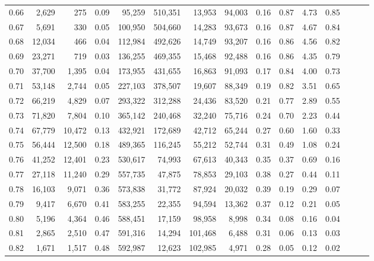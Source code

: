 \begin{tabular}{rrrrrrrrrrrrrrr}
0.66 &   2,629 &     275 &  0.09 &   95,259 &  510,351 &   13,953 &   94,003 &  0.16 &  0.87 &  4.73 &      0.85 \\
0.67 &   5,691 &     330 &  0.05 &  100,950 &  504,660 &   14,283 &   93,673 &  0.16 &  0.87 &  4.67 &      0.84 \\
0.68 &  12,034 &     466 &  0.04 &  112,984 &  492,626 &   14,749 &   93,207 &  0.16 &  0.86 &  4.56 &      0.82 \\
0.69 &  23,271 &     719 &  0.03 &  136,255 &  469,355 &   15,468 &   92,488 &  0.16 &  0.86 &  4.35 &      0.79 \\
0.70 &  37,700 &   1,395 &  0.04 &  173,955 &  431,655 &   16,863 &   91,093 &  0.17 &  0.84 &  4.00 &      0.73 \\
0.71 &  53,148 &   2,744 &  0.05 &  227,103 &  378,507 &   19,607 &   88,349 &  0.19 &  0.82 &  3.51 &      0.65 \\
0.72 &  66,219 &   4,829 &  0.07 &  293,322 &  312,288 &   24,436 &   83,520 &  0.21 &  0.77 &  2.89 &      0.55 \\
0.73 &  71,820 &   7,804 &  0.10 &  365,142 &  240,468 &   32,240 &   75,716 &  0.24 &  0.70 &  2.23 &      0.44 \\
0.74 &  67,779 &  10,472 &  0.13 &  432,921 &  172,689 &   42,712 &   65,244 &  0.27 &  0.60 &  1.60 &      0.33 \\
0.75 &  56,444 &  12,500 &  0.18 &  489,365 &  116,245 &   55,212 &   52,744 &  0.31 &  0.49 &  1.08 &      0.24 \\
0.76 &  41,252 &  12,401 &  0.23 &  530,617 &   74,993 &   67,613 &   40,343 &  0.35 &  0.37 &  0.69 &      0.16 \\
0.77 &  27,118 &  11,240 &  0.29 &  557,735 &   47,875 &   78,853 &   29,103 &  0.38 &  0.27 &  0.44 &      0.11 \\
0.78 &  16,103 &   9,071 &  0.36 &  573,838 &   31,772 &   87,924 &   20,032 &  0.39 &  0.19 &  0.29 &      0.07 \\
0.79 &   9,417 &   6,670 &  0.41 &  583,255 &   22,355 &   94,594 &   13,362 &  0.37 &  0.12 &  0.21 &      0.05 \\
0.80 &   5,196 &   4,364 &  0.46 &  588,451 &   17,159 &   98,958 &    8,998 &  0.34 &  0.08 &  0.16 &      0.04 \\
0.81 &   2,865 &   2,510 &  0.47 &  591,316 &   14,294 &  101,468 &    6,488 &  0.31 &  0.06 &  0.13 &      0.03 \\
0.82 &   1,671 &   1,517 &  0.48 &  592,987 &   12,623 &  102,985 &    4,971 &  0.28 &  0.05 &  0.12 &      0.02 \\

\end{tabular}
